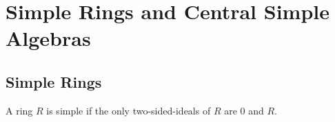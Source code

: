 \chapter{Simple Rings and Central Simple Algebras}\label{chap:simple-ring-csa}

\section{Simple Rings}\label{sec:simple-ring}

\begin{definition} A ring $R$ is simple if the only two-sided-ideals of $R$ are ${0}$ and $R$.
  \leanok
\end{definition}



